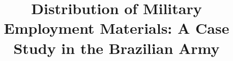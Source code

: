 \documentclass[sigconf]{acmart}
\begin{document}
\title{Distribution of Military Employment Materials: A Case Study in the Brazilian Army}



\newcommand{\callers}{\emph{high-level rules}\xspace}
\newcommand{\shc}{HLR\xspace}

\begin{abstract}



\end{abstract}
\end{document}
